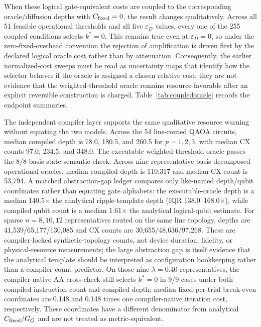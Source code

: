 \documentclass[5p,times]{elsarticle}
\begin{document}
When these logical gate-equivalent costs are coupled to the corresponding oracle/diffusion depths with $C_{\rm fixed}=0$, the result changes qualitatively. Across all 51 feasible operational thresholds and all five $\varepsilon_D$ values, every one of the 255 coupled conditions selects $k^*=0$. This remains true even at $\varepsilon_D=0$, so under the zero-fixed-overhead convention the rejection of amplification is driven first by the declared logical oracle cost rather than by attenuation. Consequently, the earlier normalized-cost sweeps must be read as uncertainty maps that identify how the selector behaves if the oracle is assigned a chosen relative cost; they are not evidence that the weighted-threshold oracle remains resource-favorable after an explicit reversible construction is charged. Table~\ref{tab:coupledoracle} records the endpoint summaries.

\begin{table}[t]
\centering
\caption{Coupled architecture-informed selector at the attenuation endpoints. $\eta_{arch}$ is resource per target hit relative to the no-amplification baseline under the same logical bookkeeping model.}
\label{tab:coupledoracle}

\end{table}

The independent compiler layer supports the same qualitative resource warning without equating the two models. Across the 54 line-routed QAOA circuits, median compiled depth is 78.0, 180.5, and 260.5 for $p=1,2,3$, with median CX counts 97.0, 234.5, and 348.0. The executable weighted-threshold oracle passes the 8/8-basis-state semantic check. Across nine representative basis-decomposed operational oracles, median compiled depth is 110,317 and median CX count is 53,794. A matched abstraction-gap ledger compares only like-named depth/qubit coordinates rather than equating gate alphabets: the executable-oracle depth is a median 140.5$\times$ the analytical ripple-template depth (IQR 138.0--168.0$\times$), while compiled qubit count is a median 1.61$\times$ the analytical logical-qubit estimate. For sparse $n=8,10,12$ representatives routed on the same line topology, depths are 41,539/65,177/130,085 and CX counts are 30,655/48,636/97,268. These are compiler-locked synthetic-topology counts, not device duration, fidelity, or physical-resource measurements; the large abstraction gap is itself evidence that the analytical template should be interpreted as configuration bookkeeping rather than a compiler-count predictor. On those nine $\lambda=0.40$ representatives, the compiler-native AA cross-check still selects $k^*=0$ in 9/9 cases under both compiled instruction count and compiled depth; median fixed-per-trial break-even coordinates are 0.148 and 0.148 times one compiler-native iteration cost, respectively. These coordinates have a different denominator from analytical $C_{\rm fixed}/G_O$ and are not treated as metric-equivalent.
\end{document}
